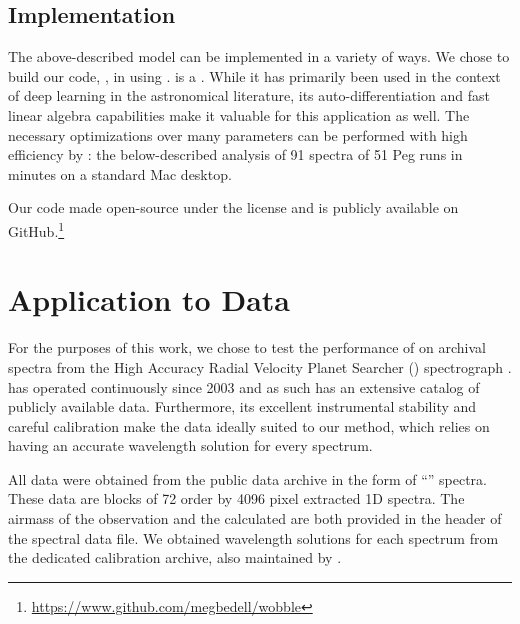 \documentclass[modern]{aastex62}
\begin{document}

\subsection{Implementation}
\label{s:implementation}

The above-described model can be implemented in a variety of ways. We chose to build our code, \wobble, in  using \TF.
\TF is a .
While it has primarily been used in the context of deep learning in the astronomical literature, its auto-differentiation and fast linear algebra capabilities make it valuable for this application as well.
The necessary optimizations over many parameters can be performed with high efficiency by \TF: the below-described analysis of 91 spectra of 51 Peg runs in  minutes on a standard Mac desktop.

Our code made open-source under the  license and is publicly available on GitHub.\footnote{\url{https://www.github.com/megbedell/wobble}}



\section{Application to \HARPS Data}
\label{s:results}

For the purposes of this work, we chose to test the performance of \wobble on archival spectra from the High Accuracy Radial Velocity Planet Searcher (\HARPS) spectrograph \citep{Mayor2003}.
\HARPS has operated continuously since 2003 and as such has an extensive catalog of publicly available data.
Furthermore, its excellent instrumental stability and careful calibration make the data ideally suited to our method, which relies on having an accurate wavelength solution for every spectrum.

All data were obtained from the  public data archive in the form of ``'' spectra.
These data are blocks of 72 order by 4096 pixel extracted 1D spectra.
The airmass of the observation and the calculated \BERV are both provided in the  header of the spectral data file.
We obtained wavelength solutions for each spectrum from the dedicated \HARPS calibration archive, also maintained by .
\end{document}
